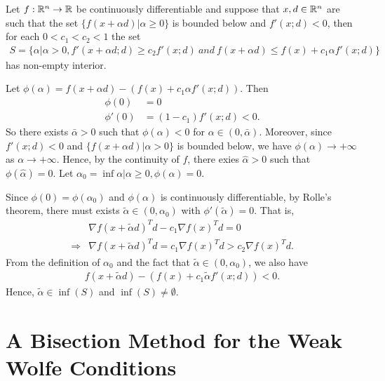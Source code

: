 \begin{lemma}{}{}
    Let $f:\mathbb{R}^n\rightarrow \mathbb{R}$ be continuously differentiable and suppose that $x,d\in \mathbb{R}^n$ are such
    that the set $\{f(x+\alpha d)|\alpha \geq 0\}$ is bounded below and $f'(x;d)<0$, then for each $0<c_1<c_2<1$ the set
    \begin{align*}
       S= \{\alpha |\alpha >0, f'(x+\alpha d;d)\geq c_2f'(x;d) \ and\  f(x+\alpha d)\leq f(x)+c_1\alpha f'(x;d)\}
    \end{align*}
    has non-empty interior.
\end{lemma}
\begin{proofsolution}
    Let $\phi(\alpha) = f(x+\alpha d)-(f(x)+c_1\alpha f'(x;d))$. Then 
    \begin{align*}
        \phi(0)&=0 \\
        \phi'(0)&=(1-c_1)f'(x;d)<0.
    \end{align*}
    So there exists $\bar{\alpha}>0$
    such that $\phi(\alpha)<0$ for $\alpha \in (0,\bar{\alpha})$. Moreover, since $f'(x;d)<0$ and $\{f(x+\alpha d)|\alpha>0\}$ is bounded below, 
    we have $\phi(\alpha)\rightarrow +\infty$ as $\alpha\rightarrow +\infty$. Hence, by the continuity of $f$, there exies $\hat{\alpha}>0$ such that $\phi(\hat{\alpha})=0$. Let $\alpha_0= \inf{\alpha|\alpha\geq 0,\phi(\alpha)=0}$.
    \par
    Since $\phi(0)=\phi(\alpha_0)$ and $\phi(\alpha)$ is continuously differentiable, by Rolle's theorem, there must exists $\widetilde{\alpha}\in (0,\alpha_0)$ with $\phi'(\widetilde{\alpha})=0$. That is, 
    \begin{align*}
        & \nabla f(x+\widetilde{\alpha}d)^Td-c_1\nabla f(x)^Td=0\\
      \Rightarrow  &\nabla f(x+\widetilde{\alpha}d)^Td = c_1\nabla f(x)^Td > c_2\nabla f(x)^Td.
    \end{align*}
    From the definition of $\alpha_0$ and the fact that $\widetilde{\alpha}\in (0,\alpha_0)$, we also have
    \begin{align*}
        f(x+\widetilde{\alpha} d)-(f(x)+c_1\widetilde{\alpha} f'(x;d))<0.
    \end{align*}
    Hence, $\widetilde{\alpha}\in \inf(S)$ and $\inf(S)\neq \emptyset$.
\end{proofsolution}

\section{A Bisection Method for the Weak Wolfe Conditions}


